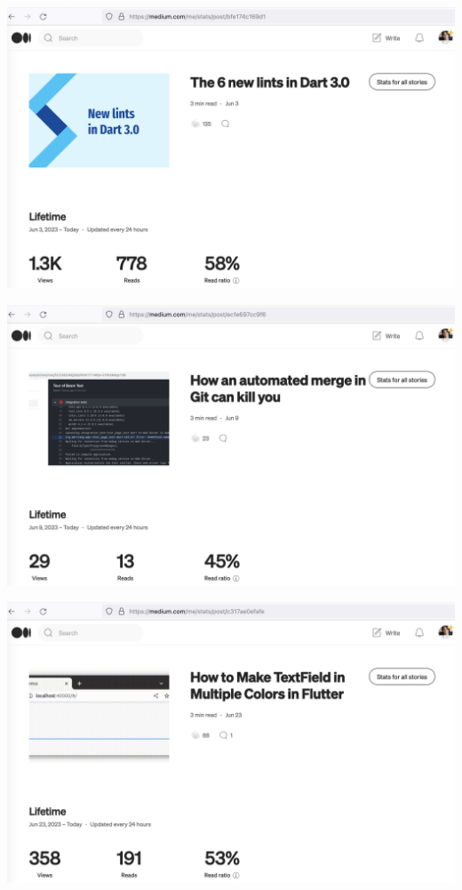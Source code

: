 \begin{center}
    \includegraphics[width=\textwidth]{2023-06-03_lints}
\end{center}

\begin{center}
    \includegraphics[width=\textwidth]{2023-06-09_merge}
\end{center}

\begin{center}
    \includegraphics[width=\textwidth]{2023-06-23_colors}
\end{center}

